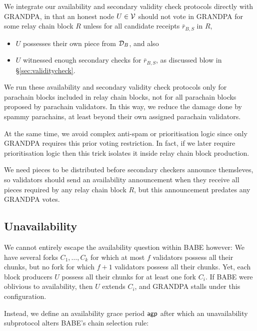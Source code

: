 We integrate our availability and secondary validity check protocols directly with GRANDPA, in that an honest node $U \in \mathcal{V}$ should not vote in GRANDPA for some relay chain block $R$ unless for all candidate receipts $\bar{r}_{B,S}$ in $R$,
\begin{itemize}
\item $U$ possesses their own piece from $\mathcal{D}_B$, and also
\item $U$ witnessed enough secondary checks for $\bar{r}_{B,S}$,
 as discussed blow in \S\ref{sec:validitycheck}.
\end{itemize}

We run these availability and secondary validity check protocols only for parachain blocks included in relay chain blocks, not for all parachain blocks proposed by parachain validators.  In this way, we reduce the damage done by spammy parachains, at least beyond their own assigned parachain validators.

At the same time, we avoid complex anti-spam or prioritisation logic since only GRANDPA requires this prior voting restriction.  In fact, if we later require prioritisation logic then this trick isolates it inside relay chain block production.

We need pieces to be distributed before secondary checkers announce themsleves, so validators should send an availability announcement when they receive all pieces required by any relay chain block $R$, but this announcement predates any GRANDPA votes. 


\subsection{Unavailability} %
\label{sec:unavailability}

We cannot entirely escape the availability question within BABE however:  We have several forks $C_1,\ldots,C_k$ for which at most $f$ validators possess all their chunks, but no fork for which $f+1$ validators possess all their chunks.  Yet, each block producers $U$ possess all their chunks for at least one fork $C_i$.  If BABE were oblivious to availability, then $U$ extends $C_i$, and GRANDPA stalls under this configuration. 

Instead, we define an availability grace period $\mathsf{agp}$ after which an unavailability subprotocol alters BABE's chain selection rule:  

